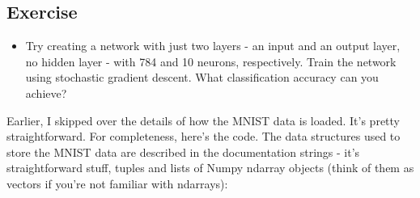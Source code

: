 \documentclass[a4paper,12pt]{report}%
\begin{document}
\subsection{Exercise}
\begin{itemize}
\item Try creating a network with just two layers - an input and an output layer, no hidden layer - with 784 and 10 neurons, respectively. Train the network using stochastic gradient descent. What classification accuracy can you achieve?
\end{itemize}

Earlier, I skipped over the details of how the MNIST data is loaded. It's pretty straightforward. For completeness, here's the code. The data structures used to store the MNIST data are described in the documentation strings - it's straightforward stuff, tuples and lists of Numpy ndarray objects (think of them as vectors if you're not familiar with ndarrays):
\end{document}
